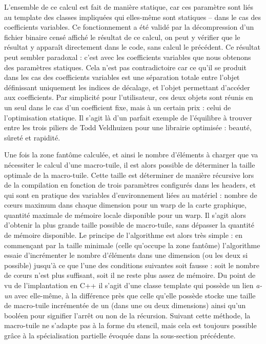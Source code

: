 L'ensemble de ce calcul est fait de manière statique, car ces paramètre sont liés au template des classes impliquées qui elles-même sont statiques -- dans le cas des coefficients variables. Ce fonctionnement a été validé par la décompression d'un fichier binaire censé affiché le résultat de ce calcul, on peut y vérifier que le résultat y apparaît directement dans le code, sans calcul le précédent. Ce résultat peut sembler paradoxal : c'est avec les coefficients variables que nous obtenons des paramètres statiques. Cela n'est pas contradictoire car ce qu'il se produit dans les cas des coefficients variables est une séparation totale entre l'objet définissant uniquement les indices de décalage, et l'objet permettant d'accéder aux coefficients. Par simplicité pour l'utilisateur, ces deux objets sont réunis en un seul dans le cas d'un coefficient fixe, mais à un certain prix : celui de l'optimisation statique. Il s'agit là d'un parfait exemple de l'équilibre à trouver entre les trois piliers de Todd Veldhuizen pour une librairie optimisée : beauté, sûreté et rapidité.

Une fois la zone fantôme calculée, et ainsi le nombre d'éléments à charger que va nécessiter le calcul d'une macro-tuile, il est alors possible de déterminer la taille optimale de la macro-tuile. Cette taille est déterminer de manière récursive lors de la compilation en fonction de trois paramètres configurés dans les headers, et qui sont en pratique des variables d'environnement liées au matériel : nombre de cœurs maximum dans chaque dimension pour un warp de la carte graphique, quantité maximale de mémoire locale disponible pour un warp. Il s'agit alors d'obtenir la plus grande taille possible de macro-tuile, sans dépasser la quantité de mémoire disponible. Le principe de l'algorithme est alors très simple : en commençant par la taille minimale (celle qu'occupe la zone fantôme) l'algorithme essaie d'incrémenter le nombre d'éléments dans une dimension (ou les deux si possible) jusqu'à ce que l'une des conditions suivantes soit fausse : soit le nombre de cœurs n'est plus suffisant, soit il ne reste plus assez de mémoire. Du point de vu de l'implantation en \textsf{C++} il s'agit d'une classe template qui possède un lien \emph{a-un} avec elle-même, à la différence près que celle qu'elle possède stocke une taille de macro-tuile incrémentée de un (dans une ou deux dimensions) ainsi qu'un booléen pour signifier l'arrêt ou non de la récursion. Suivant cette méthode, la macro-tuile ne s'adapte pas à la forme du stencil, mais cela est toujours possible grâce à la spécialisation partielle évoquée dans la sous-section précédente.

